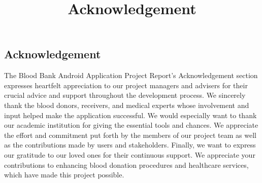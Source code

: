 \title{Acknowledgement}
\begin{center}
    \section*{Acknowledgement}
\end{center}
\vspace{5.5mm}
The Blood Bank Android Application Project Report's Acknowledgement section expresses
heartfelt appreciation to our project managers and advisers for their crucial advice and support
throughout the development process. We sincerely thank the blood donors, receivers, and
medical experts whose involvement and input helped make the application successful. We would
especially want to thank our academic institution for giving the essential tools and chances. We
appreciate the effort and commitment put forth by the members of our project team as well as the
contributions made by users and stakeholders. Finally, we want to express our gratitude to our
loved ones for their continuous support. We appreciate your contributions to enhancing blood
donation procedures and healthcare services, which have made this project possible.
